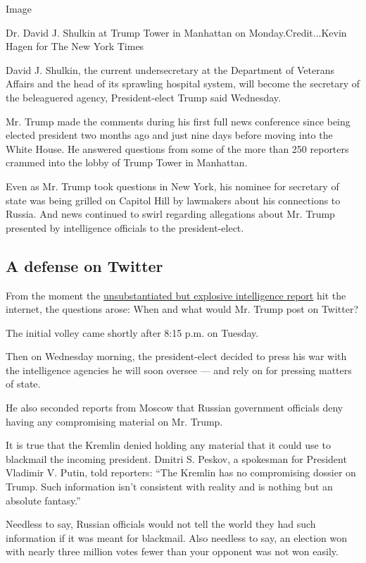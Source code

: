 Image

Dr. David J. Shulkin at Trump Tower in Manhattan on
Monday.Credit...Kevin Hagen for The New York Times

David J. Shulkin, the current undersecretary at the Department of
Veterans Affairs and the head of its sprawling hospital system, will
become the secretary of the beleaguered agency, President-elect Trump
said Wednesday.

Mr. Trump made the comments during his first full news conference since
being elected president two months ago and just nine days before moving
into the White House. He answered questions from some of the more than
250 reporters crammed into the lobby of Trump Tower in Manhattan.

Even as Mr. Trump took questions in New York, his nominee for secretary
of state was being grilled on Capitol Hill by lawmakers about his
connections to Russia. And news continued to swirl regarding allegations
about Mr. Trump presented by intelligence officials to the
president-elect.

\hypertarget{a-defense-on-twitter}{%
\subsection{A defense on Twitter}\label{a-defense-on-twitter}}

From the moment the
\href{https://www.nytimes.com/2017/01/10/us/politics/donald-trump-russia-intelligence.html}{unsubstantiated
but explosive intelligence report} hit the internet, the questions
arose: When and what would Mr. Trump post on Twitter?

The initial volley came shortly after 8:15 p.m. on Tuesday.

Then on Wednesday morning, the president-elect decided to press his war
with the intelligence agencies he will soon oversee --- and rely on for
pressing matters of state.

He also seconded reports from Moscow that Russian government officials
deny having any compromising material on Mr. Trump.

It is true that the Kremlin denied holding any material that it could
use to blackmail the incoming president. Dmitri S. Peskov, a spokesman
for President Vladimir V. Putin, told reporters: ``The Kremlin has no
compromising dossier on Trump. Such information isn't consistent with
reality and is nothing but an absolute fantasy.''

Needless to say, Russian officials would not tell the world they had
such information if it was meant for blackmail. Also needless to say, an
election won with nearly three million votes fewer than your opponent
was not won easily.

